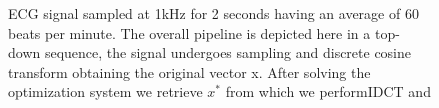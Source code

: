 \documentclass[journal,article,submit,electronics,pdftex]{Definitions/mdpi}
\begin{document}
{\begin{figure}[H]
\centering
{}
\caption{ECG signal sampled at 1kHz for 2 seconds having an average of 60 beats per minute. The overall pipeline is depicted here in a top-down sequence, the signal undergoes sampling and discrete cosine transform obtaining the original vector x. After solving the optimization system we retrieve $x^*$ from which we performIDCT and  }
\label{fig:ecg_appendix}
\end{figure}

\begin{figure}[H]
\centering
\hspace*{\fill}
%
\hspace*{\fill}
%
\newline
\centering
{}%


\end{figure}}
\end{document}
